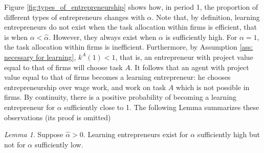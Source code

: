 \documentclass[12pt,american]{paper}
\theoremstyle{remark}
\newtheorem{lemma}{Lemma}
\begin{document}
Figure \ref{fig:types_of_entrepreneurship} shows how, in period 1, the proportion of different types of entrepreneurs changes with $\alpha$. Note that, by definition, learning entrepreneurs do not exist when the task allocation within firms is efficient, that is when $\alpha<\hat \alpha$. However, they always exist when $\alpha$ is sufficiently high.  For $\alpha=1$, the task allocation within firms is inefficient. Furthermore, by Assumption \ref{ass: necessary for learning}, $k^A(1)<1$, that is, an entrepreneur with project value equal to that of firms will choose task $A$. It follows that an agent with project value equal to that of firms becomes a learning entrepreneur: he chooses entrepreneurship over wage work, and work on task $A$ which is not possible in firms.  By continuity, there is a positive probability of becoming a learning entrepreneur for $\alpha$ sufficiently close to 1. The following Lemma summarizes these observations (its proof is omitted)
\begin{lemma}
Suppose $\hat \alpha>0$. Learning entrepreneurs exist for $\alpha$ sufficiently high but not for $\alpha $ sufficiently low.
\end{lemma}
\end{document}
